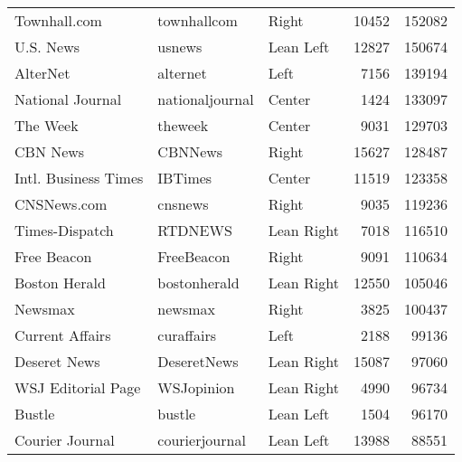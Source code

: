 \begin{center}
\begin{longtable}{lllrr}
                             Townhall.com &      townhallcom &         Right &             10452 &     152082 \\
                                U.S. News &           usnews &     Lean Left &             12827 &     150674 \\
                                 AlterNet &         alternet &          Left &              7156 &     139194 \\
                         National Journal &  nationaljournal &        Center &              1424 &     133097 \\
                                 The Week &          theweek &        Center &              9031 &     129703 \\
                                 CBN News &          CBNNews &         Right &             15627 &     128487 \\
                     Intl. Business Times &          IBTimes &        Center &             11519 &     123358 \\
                              CNSNews.com &          cnsnews &         Right &              9035 &     119236 \\
                           Times-Dispatch &          RTDNEWS &    Lean Right &              7018 &     116510 \\
                              Free Beacon &       FreeBeacon &         Right &              9091 &     110634 \\
                            Boston Herald &     bostonherald &    Lean Right &             12550 &     105046 \\
                                  Newsmax &          newsmax &         Right &              3825 &     100437 \\
                          Current Affairs &       curaffairs &          Left &              2188 &      99136 \\
                             Deseret News &      DeseretNews &    Lean Right &             15087 &      97060 \\
                       WSJ Editorial Page &       WSJopinion &    Lean Right &              4990 &      96734 \\
                                   Bustle &           bustle &     Lean Left &              1504 &      96170 \\
                          Courier Journal &   courierjournal &     Lean Left &             13988 &      88551 \\

\end{longtable}
\end{center}
